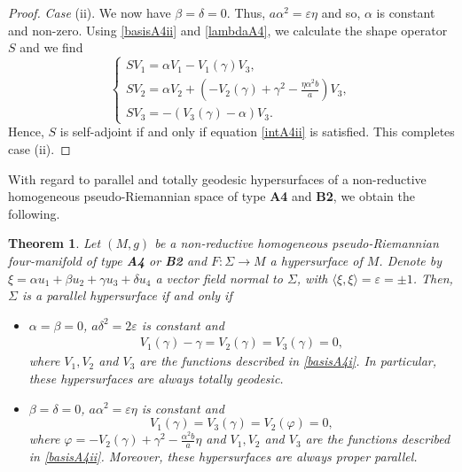 \documentclass{amsart}
\theoremstyle{plain}
\newtheorem{theorem}{Theorem}
\theoremstyle{remark}
\begin{document}
{\begin{proof}
\smallskip
{\em Case} (ii). We now have $\beta=\delta=0$. Thus, $a\alpha ^2 =\varepsilon \eta$ and so, $\alpha$ is constant and non-zero. Using \eqref{basisA4ii} and \eqref{lambdaA4}, we calculate the shape operator $S$ and we find
%
\begin{equation}\label{sA4ii}
\left\{
\begin{array}{l}
SV_1 =  \alpha V_1 -V_1(\gamma) V_3, \\[2 pt]
SV_2 =  \alpha V_2 + \left(-V_2(\gamma)+\gamma^2-\frac{\eta\alpha^2 b }{a}\right) V_3, \\[2 pt]
SV_3 =  -(V_3(\gamma)-\alpha)V_3.
\end{array}
\right.
\end{equation}
Hence, $S$ is self-adjoint if and only if equation \eqref{intA4ii} is satisfied.
%
This completes case (ii). 
\end{proof}


With regard to parallel and totally geodesic hypersurfaces of a non-reductive homogeneous pseudo-Riemannian space of type \textbf{A4} and \textbf{B2}, we obtain the following.


\begin{theorem}\label{parA4}
Let $(M,g)$ be a non-reductive homogeneous pseudo-Riemannian four-manifold of type {\rm\bf A4} or {\rm\bf B2} and $F : \Sigma \to M$ a hypersurface of $M$. Denote by $\xi=\alpha u_1+\beta u_2+\gamma u_3+\delta u_4$ a vector field normal to $\Sigma$, with $\langle \xi ,\xi \rangle=\varepsilon=\pm 1$. Then, $\Sigma$ is a parallel hypersurface if and only if
\begin{itemize}
\item[(1)] $\alpha=\beta=0$, $a\delta^2 = 2\varepsilon$ is constant and 
\begin{equation}\label{parA4i}
\begin{array}{l}
V_1(\gamma)-\gamma=V_2(\gamma)=V_3(\gamma)=0,
\end{array}
\end{equation}
%
where $V_1,V_2$ and $V_3$ are the functions described in \eqref{basisA4i}. In particular, these hypersurfaces are always totally geodesic. 
\item[(2)] $\beta = \delta= 0$, $a\alpha^2 = \varepsilon \eta$ is constant  and
\begin{equation}\label{parA4ii}
V_1(\gamma) = V_3(\gamma) = V_2(\varphi) = 0,
\end{equation}
where $\varphi = -V_2(\gamma) + \gamma^2-\frac{\alpha^2b}{a}\eta$ and $V_1,V_2$ and $V_3$ are the functions described in \eqref{basisA4ii}. Moreover, these hypersurfaces are always proper parallel. 
\end{itemize}
\end{theorem} 

}
\end{document}
